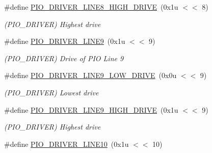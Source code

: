 \begin{DoxyCompactItemize}
\mbox{\label{group__SAMV71__PIO_ga75e87ed1b81aa1cd7fd5f0feeedd3738}} 
\#define \mbox{\hyperlink{group__SAMV71__PIO_ga75e87ed1b81aa1cd7fd5f0feeedd3738}{P\+I\+O\+\_\+\+D\+R\+I\+V\+E\+R\+\_\+\+L\+I\+N\+E8\+\_\+\+H\+I\+G\+H\+\_\+\+D\+R\+I\+VE}}~(0x1u $<$$<$ 8)
\begin{DoxyCompactList}\small\item\em (P\+I\+O\+\_\+\+D\+R\+I\+V\+ER) Highest drive \end{DoxyCompactList}\item 
\mbox{\label{group__SAMV71__PIO_ga6c74e055b263bd3659785590ffc5af3e}} 
\#define \mbox{\hyperlink{group__SAMV71__PIO_ga6c74e055b263bd3659785590ffc5af3e}{P\+I\+O\+\_\+\+D\+R\+I\+V\+E\+R\+\_\+\+L\+I\+N\+E9}}~(0x1u $<$$<$ 9)
\begin{DoxyCompactList}\small\item\em (P\+I\+O\+\_\+\+D\+R\+I\+V\+ER) Drive of P\+IO Line 9 \end{DoxyCompactList}\item 
\mbox{\label{group__SAMV71__PIO_gab73216f55ecfab8af6f14e7af7438ea3}} 
\#define \mbox{\hyperlink{group__SAMV71__PIO_gab73216f55ecfab8af6f14e7af7438ea3}{P\+I\+O\+\_\+\+D\+R\+I\+V\+E\+R\+\_\+\+L\+I\+N\+E9\+\_\+\+L\+O\+W\+\_\+\+D\+R\+I\+VE}}~(0x0u $<$$<$ 9)
\begin{DoxyCompactList}\small\item\em (P\+I\+O\+\_\+\+D\+R\+I\+V\+ER) Lowest drive \end{DoxyCompactList}\item 
\mbox{\label{group__SAMV71__PIO_ga1842cebae3bfe368194f0a97b04a0e58}} 
\#define \mbox{\hyperlink{group__SAMV71__PIO_ga1842cebae3bfe368194f0a97b04a0e58}{P\+I\+O\+\_\+\+D\+R\+I\+V\+E\+R\+\_\+\+L\+I\+N\+E9\+\_\+\+H\+I\+G\+H\+\_\+\+D\+R\+I\+VE}}~(0x1u $<$$<$ 9)
\begin{DoxyCompactList}\small\item\em (P\+I\+O\+\_\+\+D\+R\+I\+V\+ER) Highest drive \end{DoxyCompactList}\item 
\mbox{\label{group__SAMV71__PIO_gad2bb37259d8bbb7c34c103a3ab2bba89}} 
\#define \mbox{\hyperlink{group__SAMV71__PIO_gad2bb37259d8bbb7c34c103a3ab2bba89}{P\+I\+O\+\_\+\+D\+R\+I\+V\+E\+R\+\_\+\+L\+I\+N\+E10}}~(0x1u $<$$<$ 10)
$$
\end{DoxyCompactItemize}
